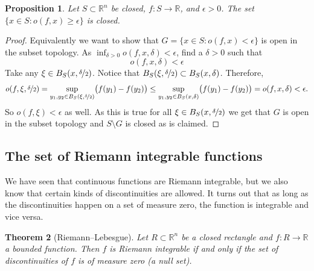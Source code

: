 \documentclass[12pt]{book}
\newcommand{\R}{{\mathbb{R}}}
\theoremstyle{plain}
\newtheorem{thm}{Theorem}[section]
\newtheorem{prop}[thm]{Proposition}
\theoremstyle{remark}
\theoremstyle{definition}
\theoremstyle{exercise}
\theoremstyle{example}
\begin{document}
\begin{prop} \label{prop:seclosed}
Let $S \subset \R^n$ be closed,
$f \colon S \to \R$, and $\epsilon > 0$.
The set $\{ x \in S : o(f,x) \geq \epsilon \}$ is closed.
\end{prop}

\begin{proof}
Equivalently we want to show that
$G = \{ x \in S : o(f,x) < \epsilon \}$ is open in the subset topology.
As $\inf_{\delta > 0} o(f,x,\delta) < \epsilon$, find a $\delta > 0$ such
that
\begin{equation*}
o(f,x,\delta) < \epsilon
\end{equation*}
Take any $\xi \in B_S(x,\nicefrac{\delta}{2})$.  Notice that
$B_S(\xi,\nicefrac{\delta}{2}) \subset B_S(x,\delta)$.  Therefore,
\begin{equation*}
o(f,\xi,\nicefrac{\delta}{2}) =
\sup_{y_1,y_2 \in B_S(\xi,\nicefrac{\delta}{2})} \bigl(f(y_1)-f(y_2)\bigr) 
\leq
\sup_{y_1,y_2 \in B_S(x,\delta)} \bigl(f(y_1)-f(y_2)\bigr) = o(f,x,\delta) <
\epsilon .
\end{equation*}
So $o(f,\xi) < \epsilon$ as well.  As this is true for all $\xi \in
B_S(x,\nicefrac{\delta}{2})$ we get that $G$ is open in the subset
topology and $S \setminus G$ is closed as is claimed.
\end{proof}


\subsection{The set of Riemann integrable functions}

We have seen that continuous functions are Riemann integrable, but we also
know that certain kinds of discontinuities are allowed.
It turns out that as long as the discontinuities happen on a set of measure
zero, the function is integrable and vice versa.

\begin{thm}[Riemann--Lebesgue]
Let $R \subset \R^n$ be a closed rectangle and $f \colon R \to \R$
a bounded function.  Then $f$ is Riemann integrable if and only if
the set of discontinuities of $f$ is of measure zero (a null set).
\end{thm}
\end{document}
